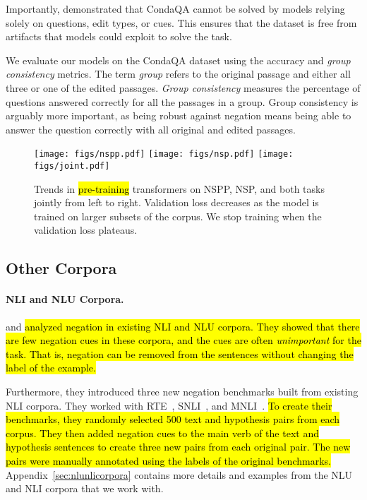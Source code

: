 Importantly, \citet{ravichander-etal-2022-condaqa} {demonstrated that CondaQA cannot be solved by models relying solely on questions, edit types, or cues. 
This ensures that the dataset is free from artifacts that models could exploit to solve the task.}


We evaluate our models on the CondaQA dataset using the accuracy and \emph{group consistency} metrics.
The term \emph{group} refers to the original passage and either all three or one of the edited passages.
\emph{Group consistency} measures the percentage of questions answered correctly for all the passages in a group.
Group consistency is arguably more important,
as being robust against negation means being able to answer the question correctly with all original and edited passages.

\begin{figure*}
    \centering
    \texttt{[image: figs/nspp.pdf]}
    \texttt{[image: figs/nsp.pdf]}
    \texttt{[image: figs/joint.pdf]}
    \caption{
        Trends in \hl{pre-training} transformers on NSPP, NSP, and both tasks jointly from left to right.
        Validation loss decreases as the model is trained on larger subsets of the corpus.
        We stop training when the validation loss plateaus.
        \label{fig:pretraining}
    }
\end{figure*}
\subsection{Other Corpora}
\label{sec:othercorpora}
\paragraph{NLI and NLU Corpora.}
\citet{hossain-etal-2020-analysis} and \citet{hossain-etal-2022-analysis} \hl{analyzed negation in existing NLI and NLU corpora.
They showed that there are few negation cues in these corpora,
and the cues are often \emph{unimportant} for the task.
That is, negation can be removed from the sentences without changing the label of the example.}

Furthermore,
they introduced three new negation benchmarks built from existing NLI corpora.
They worked with RTE~\cite{dagan2005pascal,BarHaim2006TheSP,giampiccolo-etal-2007-third,DBLP:conf/tac/BentivogliMDDG09},
SNLI~\cite{bowman-etal-2015-large}, and MNLI~\cite{williams-etal-2018-broad}.
\hl{To create their benchmarks, they randomly selected 500 text and hypothesis pairs from each corpus.
They then added negation cues to the main verb of the text and hypothesis sentences to create three new pairs from each original pair.
The new pairs were manually annotated using the labels of the original benchmarks.}
Appendix~\ref{sec:nlunlicorpora} contains more details and examples from the NLU and NLI corpora that we work with. 


